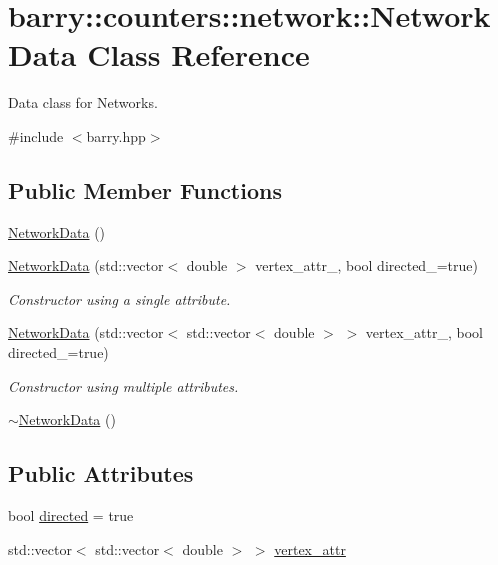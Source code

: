 \hypertarget{classbarry_1_1counters_1_1network_1_1_network_data}{}\section{barry\+:\+:counters\+:\+:network\+:\+:Network\+Data Class Reference}
\label{classbarry_1_1counters_1_1network_1_1_network_data}


Data class for Networks.  




{\ttfamily \#include $<$barry.\+hpp$>$}

\subsection*{Public Member Functions}
\begin{DoxyCompactItemize}
\item 
\hyperlink{classbarry_1_1counters_1_1network_1_1_network_data_a285d956b719012c5296aa537aca17fb2}{Network\+Data} ()
\item 
\hyperlink{classbarry_1_1counters_1_1network_1_1_network_data_a6db461d607e95bc04dfb527f3422142d}{Network\+Data} (std\+::vector$<$ double $>$ vertex\+\_\+attr\+\_\+, bool directed\+\_\+=true)
\begin{DoxyCompactList}\small\item\em Constructor using a single attribute. \end{DoxyCompactList}\item 
\hyperlink{classbarry_1_1counters_1_1network_1_1_network_data_ac37270f77de515f8a60a18b75a5bb60d}{Network\+Data} (std\+::vector$<$ std\+::vector$<$ double $>$ $>$ vertex\+\_\+attr\+\_\+, bool directed\+\_\+=true)
\begin{DoxyCompactList}\small\item\em Constructor using multiple attributes. \end{DoxyCompactList}\item 
\hyperlink{classbarry_1_1counters_1_1network_1_1_network_data_a60bea8d32eea6cd2eca0de3a84257382}{$\sim$\+Network\+Data} ()
\end{DoxyCompactItemize}
\subsection*{Public Attributes}
\begin{DoxyCompactItemize}
\item 
bool \hyperlink{classbarry_1_1counters_1_1network_1_1_network_data_a9262461efbee895496824c0d09e1abbc}{directed} = true
\item 
std\+::vector$<$ std\+::vector$<$ double $>$ $>$ \hyperlink{classbarry_1_1counters_1_1network_1_1_network_data_ac3a4971ef7e4b087b29cf30e7ddb0ea8}{vertex\+\_\+attr}
\end{DoxyCompactItemize}


